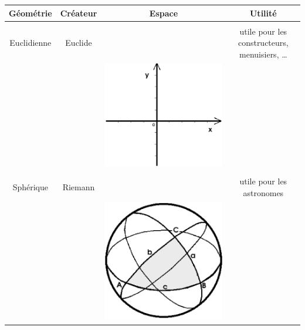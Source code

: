 \documentclass[letterpaper, 12pt]{article}
\begin{document}
\begin{center}
\begin{tabular}{|c|c|c|c|} \hline
{\bf G\'eom\'etrie} & {\bf Cr\'eateur} & {\bf Espace} & {\bf Utilit\'e}\\ \hline \hline
& & & \\
Euclidienne & Euclide & & utile pour les constructeurs, menuisiers, \dots\\
& & \includegraphics[scale=0.19]{euclidienne.eps} & \\[2mm] \hline
& & & \\
Sph\'erique & Riemann & & utile pour les astronomes\\
& & \includegraphics[scale=0.2]{riemanienne.eps} & \\[2mm]

\end{tabular}
\end{center}
\end{document}
